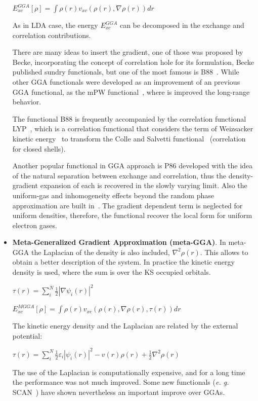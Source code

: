 \begin{itemize}
$E_{xc}^{GGA} [\rho] = \int \rho (r) v_{xc}(\rho (r), \nabla\rho (r)) dr$

As in LDA case, the energy $E_{xc}^{GGA}$ can be decomposed in the exchange
and correlation contributions.

There are many ideas to insert the gradient, one of those was proposed by
Becke, incorporating the concept of correlation hole for its formulation, Becke
published sundry functionals, but one of the most famous is
B88~\cite{Becke1988}. While other GGA functionals were developed as an
improvement of an previous GGA functional, as the mPW
functional~\cite{Adamo1998}, where is improved the long-range behavior.

The functional B88 is frequently accompanied by the correlation functional
LYP~\cite{Lee1988}, which is a correlation functional that considers the term
of Weizsacker kinetic energy~\cite{weizsacker1935theorie} to transform the
Colle and Salvetti functional~\cite{Colle1975} (correlation for closed shells).

Another popular functional in GGA approach is P86 developed with the idea of
the natural separation between exchange and correlation, thus the
density-gradient expansion of each is recovered in the slowly varying limit.
Also the uniform-gas and inhomogeneity effects beyond the random phase
approximation are built in~\cite{Perdew1986}. The gradient dependent term is
neglected for uniform densities, therefore, the functional recover the local
form for uniform electron gases.


\item \textbf{Meta-Generalized Gradient Approximation (meta-GGA)}.  In meta-GGA
the Laplacian of the density is also included, $\nabla^{2}\rho (r)$. This
allows to obtain a better description of the system.  In practice the kinetic
energy density is used, where the sum is over the \gls{KS} occupied orbitals.

$\tau (r) = \displaystyle\sum_{i}^{N} \displaystyle\frac12 |\nabla\psi_i (r)|^{2}$

$E_{xc}^{MGGA} [\rho] =\int\rho (r) v_{xc}(\rho (r), \nabla\rho (r), \tau (r)) dr$

The kinetic energy density and the Laplacian are related by the external potential:

$\tau (r) = \displaystyle\sum_{i}^{N} \displaystyle\frac12 \varepsilon_i |\psi_i (r)|^{2}
- v(r)\rho(r) + \displaystyle\frac12 \nabla^2\rho(r)$

The use of the Laplacian is computationally expensive, and for a long time
the performance was not much improved. Some new functionals (\textit{e. g.}
SCAN~\cite{scan}) have shown nevertheless an important improve over GGAs.


\end{itemize}
